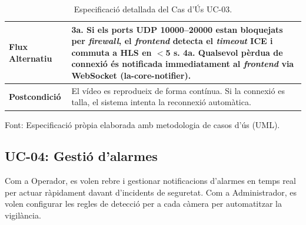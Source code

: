 \begin{table}[htbp]
\begin{tabular}{|l|p{10cm}|}
    \textbf{Flux Alternatiu}                &
    3a. Si els ports UDP 10000--20000 estan bloquejats per \textit{firewall}, el \textit{frontend} detecta el \textit{timeout} ICE i commuta a HLS en $<$5 s. \newline
    4a. Qualsevol pèrdua de connexió és notificada immediatament al \textit{frontend} via WebSocket (\textbf{la-core-notifier}).  \\ \hline
    \textbf{Postcondició}                   & El vídeo es reprodueix de forma contínua. Si la connexió es talla, el sistema intenta la reconnexió automàtica.                \\ \hline
  \end{tabular}
  \caption{Especificació detallada del Cas d'Ús UC-03.}
  \label{tab:uc_live}
\par\smallskip
\small Font: Especificació pròpia elaborada amb metodologia de casos d'ús (UML).
\end{table}

\clearpage
\subsection{UC-04: Gestió d'alarmes}
Com a Operador, es volen rebre i gestionar notificacions d'alarmes en temps real per actuar ràpidament davant d'incidents de seguretat. Com a Administrador, es volen configurar les regles de detecció per a cada càmera per automatitzar la vigilància.

